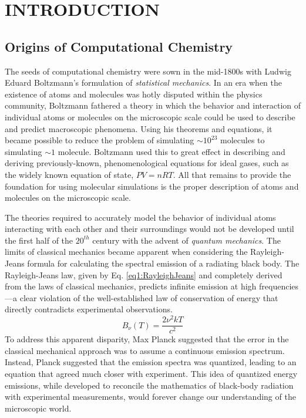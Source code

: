 \chapter{INTRODUCTION}
\label{ch1}

\section{Origins of Computational Chemistry}
The seeds of computational chemistry were sown in the mid-1800s with Ludwig
Eduard Boltzmann's formulation of \emph{statistical mechanics}. In an era when
the existence of atoms and molecules was hotly disputed within the physics
community, Boltzmann fathered a theory in which the behavior and interaction of
individual atoms or molecules on the microscopic scale could be used to
describe and predict macroscopic phenomena. Using his theorems and equations,
it became possible to reduce the problem of simulating $\sim 10^{23}$ molecules
to simulating $\sim 1$ molecule. Boltzmann used this to great effect in
describing and deriving previously-known, phenomenological equations for ideal
gases, such as the widely known equation of state, $P V = n R T$. All that
remains to provide the foundation for using molecular simulations is the proper
description of atoms and molecules on the microscopic scale.

The theories required to accurately model the behavior of individual atoms
interacting with each other and their surroundings would not be developed until
the first half of the $20^{th}$ century with the advent of \textit{quantum
mechanics}. The limits of classical mechanics became apparent when considering
the Rayleigh-Jeans formula for calculating the spectral emission of a radiating
black body. The Rayleigh-Jeans law, given by Eq. \ref{eq1:RayleighJeans} and
completely derived from the laws of classical mechanics, predicts infinite
emission at high frequencies---a clear violation of the well-established law of
conservation of energy that directly contradicts experimental observations.
\begin{equation}
   B_{\nu} (T)  = \frac{2 \nu^2 k T} {c^2}
   \label{eq1:RayleighJeans}
\end{equation}
To address this apparent disparity, Max Planck suggested that the error in the
classical mechanical approach was to assume a continuous emission spectrum.
Instead, Planck suggested that the emission spectra was quantized, leading to an
equation that agreed much closer with experiment. This idea of quantized energy
emissions, while developed to reconcile the mathematics of black-body radiation
with experimental measurements, would forever change our understanding of the
microscopic world.

